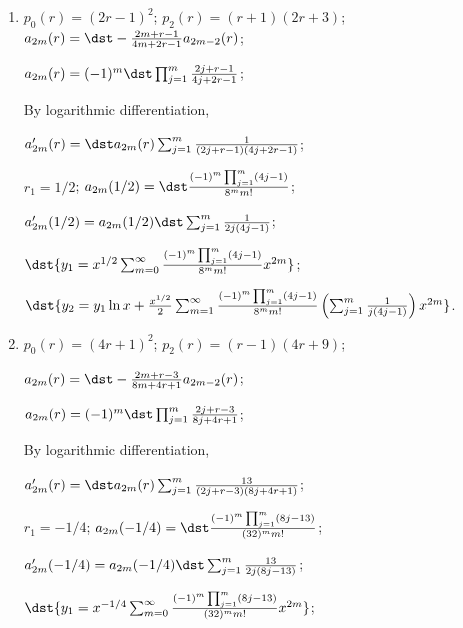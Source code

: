 \documentclass[openany]{book}
\newenvironment{sectionSolutions}{
 \begin{enumerate}[item-label={\thesection.\arabic{enumi}.}]
}{
 \end{enumerate}
}
\begin{document}
\begin{sectionSolutions}
$a_{2m}(r)=\dst-\frac{1}{4m+2r-1}
a_{2m-2}(r)$;

 $a_{2m}(r)=\dst\frac{(-1)^m}{\prod_{j=1}^m(4j+2r-1)}$;

By logarithmic differentiation,

$a_{2m}'(r)=-2\dst a_{2m}(r)\sum_{j=1}^m\frac{1}{4j+2r-1}$;

$r_1=1/2$;
$a_{2m}(1/2)=\dst\frac{(-1)^m}{4^mm!}$;

$a_{2m}'(1/2)=-\dst\frac{1}{2}a_{2m}(1/2)\sum_{j=1}^m\frac{1}{ j}$;

$\dst{y_1=x^{1/2}\sum_{m=0}^\infty\frac{(-1)^m}{4^mm!}x^{2m}}$;

$\dst{y_2=y_1\ln x-\frac{x^{1/2}}{2}\sum_{m=1}^\infty\frac{(-1)^m}{
4^mm!}\left(\sum_{j=1}^m\frac{1}{ j}\right) x^{2m}}$.

\item
$p_0(r)=(2r-1)^2$;
$p_2(r)=(r+1)(2r+3)$;
$a_{2m}(r)=\dst-\frac{2m+r-1}{4m+2r-1}
a_{2m-2}(r)$;

 $a_{2m}(r)=(-1)^m\dst\prod_{j=1}^m\frac{2j+r-1}{4j+2r-1}$;

By logarithmic differentiation,

$a_{2m}'(r)=\dst a_{2m}(r)\sum_{j=1}^m\frac{1}{(2j+r-1)(4j+2r-1)}$;

$r_1=1/2$;
$a_{2m}(1/2)=\dst\frac{(-1)^m\prod_{j=1}^m(4j-1)}{8^mm!}$;

$a_{2m}'(1/2)=a_{2m}(1/2)\dst\sum_{j=1}^m\frac{1}{2j(4j-1)}$;


$\dst{y_1=x^{1/2}\sum_{m=0}^\infty\frac{(-1)^m\prod_{j=1}^m(4j-1)}{8^mm!}
x^{2m}}$;

$\dst{y_2=y_1\ln
x+\frac{x^{1/2}}{2}\sum_{m=1}^\infty\frac{(-1)^m\prod_{j=1}^m(4j-1)}{8^mm!}
\left(\sum_{j=1}^m\frac{1}{ j(4j-1)}\right)x^{2m}}$.


\item
$p_0(r)=(4r+1)^2$;
$p_2(r)=(r-1)(4r+9)$;

$a_{2m}(r)=\dst-\frac{2m+r-3}{8m+4r+1}
a_{2m-2}(r)$;

 $a_{2m}(r)=(-1)^m\dst\prod_{j=1}^m\frac{2j+r-3}{8j+4r+1}$;

By logarithmic differentiation,

$a_{2m}'(r)=\dst a_{2m}(r)\sum_{j=1}^m\frac{13}{(2j+r-3)(8j+4r+1)}$;

$r_1=-1/4$;
$a_{2m}(-1/4)=\dst\frac{(-1)^m\prod_{j=1}^m(8j-13)}{(32)^mm!}$;

$a_{2m}'(-1/4)=a_{2m}(-1/4)\dst\sum_{j=1}^m\frac{13}{2j(8j-13)}$;


$\dst{y_1=x^{-1/4}\sum_{m=0}^\infty\frac{(-1)^m\prod_{j=1}^m(8j-13)}{(32)^mm!}
x^{2m}}$;


\end{sectionSolutions}
\end{document}
